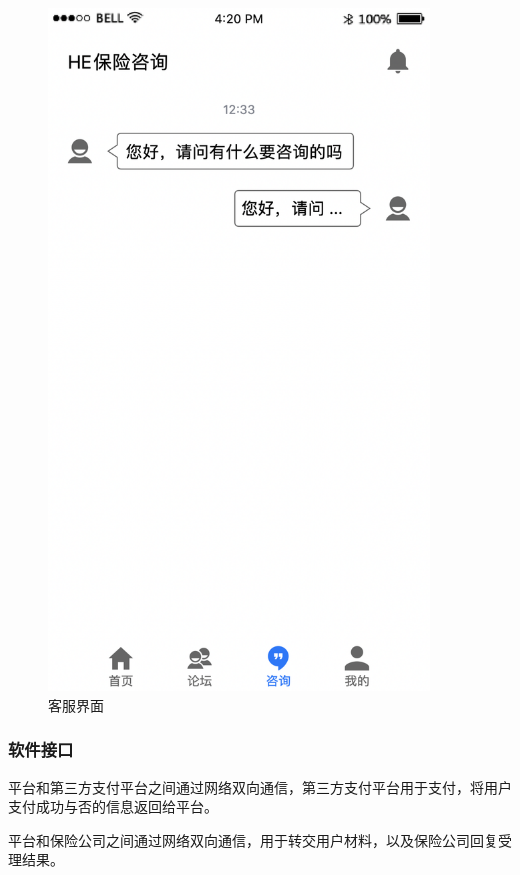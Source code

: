 \documentclass[a4paper]{ctexart}
\begin{document}
\begin{figure}[H]
\begin{minipage}[t]{0.3\textwidth}
  \includegraphics[width=0.9\textwidth]{prototype5}
  \caption{客服界面}
  \end{minipage}
\end{figure}

\subsubsection{软件接口}

平台和第三方支付平台之间通过网络双向通信，第三方支付平台用于支付，将用户支付成功与否的信息返回给平台。

平台和保险公司之间通过网络双向通信，用于转交用户材料，以及保险公司回复受理结果。
\end{document}

